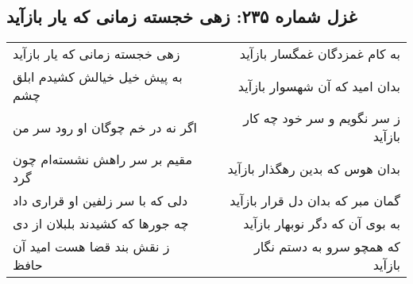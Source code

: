\begin{center}
\section*{غزل شماره ۲۳۵: زهی خجسته زمانی که یار بازآید}
\label{sec:sh235}
\begin{longtable}{l p{0.5cm} r}
زهی خجسته زمانی که یار بازآید
&&
به کام غمزدگان غمگسار بازآید
\\
به پیش خیل خیالش کشیدم ابلق چشم
&&
بدان امید که آن شهسوار بازآید
\\
اگر نه در خم چوگان او رود سر من
&&
ز سر نگویم و سر خود چه کار بازآید
\\
مقیم بر سر راهش نشسته‌ام چون گرد
&&
بدان هوس که بدین رهگذار بازآید
\\
دلی که با سر زلفین او قراری داد
&&
گمان مبر که بدان دل قرار بازآید
\\
چه جورها که کشیدند بلبلان از دی
&&
به بوی آن که دگر نوبهار بازآید
\\
ز نقش بند قضا هست امید آن حافظ
&&
که همچو سرو به دستم نگار بازآید
\\
\end{longtable}
\end{center}

